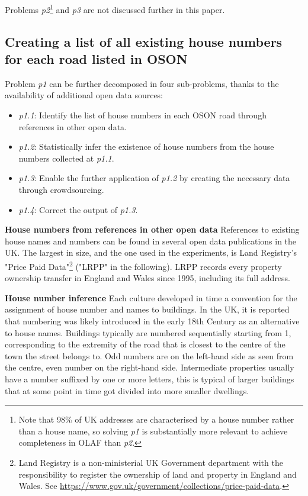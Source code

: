 Problems {\it p2}\footnote{Note that 98\% of UK addresses are characterised by a house number rather than a house name, so solving {\it p1} is substantially more relevant to achieve completeness in OLAF than {\it p2}.} and {\it p3} are not discussed further in this paper. 

\subsection{Creating a list of all existing house numbers for each road listed in OSON} 

Problem {\it p1} can be further decomposed in four sub-problems, thanks to the availability of additional open data sources:
    
\begin{itemize}
    \item {\it p1.1}: Identify the list of house numbers in each OSON road through references in other open data.
    \item {\it p1.2}: Statistically infer the existence of house numbers from the house numbers collected at {\it p1.1}.
    \item {\it p1.3}: Enable the further application of {\it p1.2} by creating the necessary data through crowdsourcing.
    \item {\it p1.4}: Correct the output of {\it p1.3}.
\end{itemize}

\textbf{House numbers from references in other open data} References to existing house names and numbers can be found in several open data publications in the UK. The largest in size, and the one used in the experiments, is Land Registry's "Price Paid Data"\footnote{Land Registry is a non-ministerial UK Government department with the responsibility to register the ownership of land and property in England and Wales. See \url{https://www.gov.uk/government/collections/price-paid-data}.} ("LRPP" in the following). LRPP records every property ownership transfer in England and Wales since 1995, including its full address.

\textbf{House number inference} Each culture developed in time a convention for the assignment of house number and names to buildings. In the UK, it is reported that numbering was likely introduced in the early 18th Century as an alternative to house names. Buildings typically are numbered sequentially starting from 1, corresponding to the extremity of the road that is closest to the centre of the town the street belongs to. Odd numbers are on the left-hand side as seen from the centre, even number on the right-hand side. Intermediate properties usually have a number suffixed by one or more letters, this is typical of larger buildings that at some point in time got divided into more smaller dwellings. 
        
